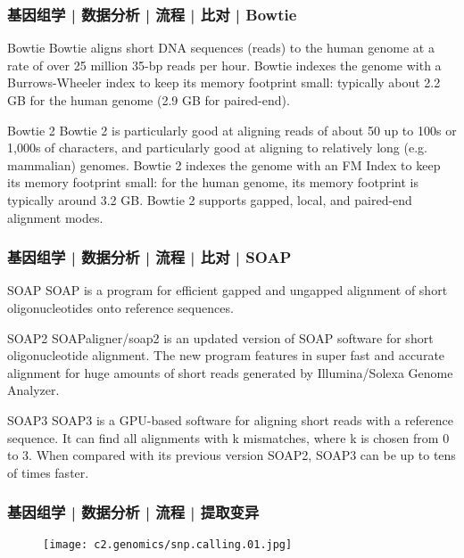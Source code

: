\begin{frame}
  \frametitle{基因组学 | 数据分析 | 流程 | 比对 | Bowtie}
  \begin{block}{Bowtie}
 Bowtie aligns short DNA sequences (reads) to the human genome at a rate of over 25 million 35-bp reads per hour. Bowtie indexes the genome with a Burrows-Wheeler index to keep its memory footprint small: typically about 2.2 GB for the human genome (2.9 GB for paired-end).  
  \end{block}
  \pause
  \begin{block}{Bowtie 2}
    Bowtie 2 is particularly good at aligning reads of about 50 up to 100s or 1,000s of characters, and particularly good at aligning to relatively long (e.g. mammalian) genomes. Bowtie 2 indexes the genome with an FM Index to keep its memory footprint small: for the human genome, its memory footprint is typically around 3.2 GB. Bowtie 2 supports gapped, local, and paired-end alignment modes. 
  \end{block}
\end{frame}

\begin{frame}
  \frametitle{基因组学 | 数据分析 | 流程 | 比对 | SOAP}
  \begin{block}{SOAP}
    SOAP is a program for efficient gapped and ungapped alignment of short oligonucleotides onto reference sequences.
  \end{block}
  \pause
  \begin{block}{SOAP2}
    SOAPaligner/soap2 is an updated version of SOAP software for short oligonucleotide alignment. The new program features in super fast and accurate alignment for huge amounts of short reads generated by Illumina/Solexa Genome Analyzer.
  \end{block}
  \pause
  \begin{block}{SOAP3}
    SOAP3 is a GPU-based software for aligning short reads with a reference sequence. It can find all alignments with k mismatches, where k is chosen from 0 to 3. When compared with its previous version SOAP2, SOAP3 can be up to tens of times faster.
  \end{block}
\end{frame}

\begin{frame}
  \frametitle{基因组学 | 数据分析 | 流程 | 提取变异}
  \begin{figure}
    \centering
    \texttt{[image: c2.genomics/snp.calling.01.jpg]}
  \end{figure}
\end{frame}

